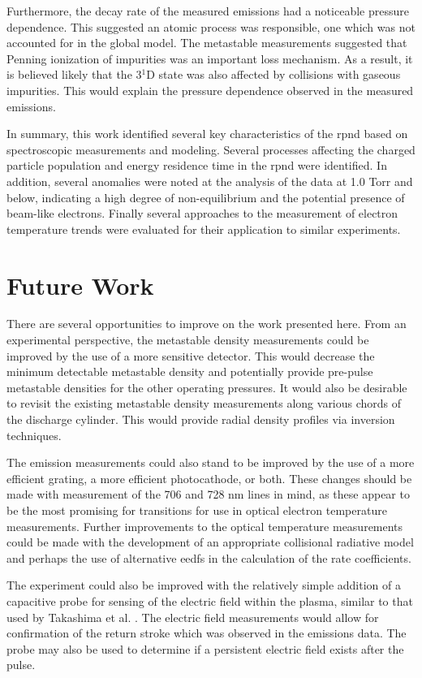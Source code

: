 Furthermore, the decay rate of the measured emissions had a noticeable pressure
dependence. This suggested an atomic process was responsible, one which was not
accounted for in the global model. The metastable measurements suggested that
Penning ionization of impurities was an important loss mechanism. As a result,
it is believed likely that the 3$^1$D state was also affected by collisions with
gaseous impurities. This would explain the pressure dependence observed in the
measured emissions.

In summary, this work identified several key characteristics of the \acs{rpnd}
based on spectroscopic measurements and modeling. Several processes affecting
the charged particle population and energy residence time in the \acs{rpnd} were
identified. In addition, several anomalies were noted at the analysis of the
data at 1.0 Torr and below, indicating a high degree of non-equilibrium and the
potential presence of beam-like electrons. Finally several approaches to the
measurement of electron temperature trends were evaluated for their application
to similar experiments.

\section{Future Work}

There are several opportunities to improve on the work presented here. From an
experimental perspective, the metastable density measurements could be improved
by the use of a more sensitive detector. This would decrease the minimum
detectable metastable density and potentially provide pre-pulse metastable
densities for the other operating pressures. It would also be desirable to
revisit the existing metastable density measurements along various chords of the
discharge cylinder. This would provide radial density profiles via inversion
techniques.

The emission measurements could also stand to be improved by the use of a more
efficient grating, a more efficient photocathode, or both. These changes should
be made with measurement of the 706 and 728 nm lines in mind, as these appear to
be the most promising for transitions for use in optical electron temperature
measurements. Further improvements to the optical temperature measurements could
be made with the development of an appropriate collisional radiative model and
perhaps the use of alternative \acs{eedf}s in the calculation of the rate
coefficients.

The experiment could also be improved with the relatively simple addition of a
capacitive probe for sensing of the electric field within the plasma, similar to
that used by Takashima et al. \cite{Takashima2011}. The electric field
measurements would allow for confirmation of the return stroke which was
observed in the emissions data. The probe may also be used to determine if a
persistent electric field exists after the pulse.

